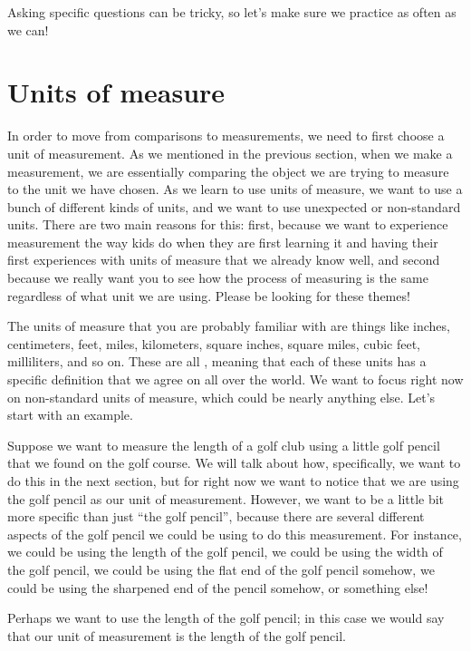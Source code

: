 \documentclass{ximera}
\begin{document}
Asking specific questions can be tricky, so let's make sure we practice as often as we can!


\section{Units of measure}

In order to move from comparisons to measurements, we need to first choose a unit of measurement. As we mentioned in the previous section, when we make a measurement, we are essentially comparing the object we are trying to measure to the unit we have chosen. As we learn to use units of measure, we want to use a bunch of different kinds of units, and we want to use unexpected or non-standard units. There are two main reasons for this: first, because we want to experience measurement the way kids do when they are first learning it and having their first experiences with units of measure that we already know well, and second because we really want you to see how the process of measuring is the same regardless of what unit we are using. Please be looking for these themes!

The units of measure that you are probably familiar with are things like inches, centimeters, feet, miles, kilometers, square inches, square miles, cubic feet, milliliters, and so on. These are all , meaning that each of these units has a specific definition that we agree on all over the world. We want to focus right now on non-standard units of measure, which could be nearly anything else. Let's start with an example.
\begin{example}
Suppose we want to measure the length of a golf club using a little golf pencil that we found on the golf course. We will talk about how, specifically, we want to do this in the next section, but for right now we want to notice that we are using the golf pencil as our unit of measurement. However, we want to be a little bit more specific than just ``the golf pencil'', because there are several different aspects of the golf pencil we could be using to do this measurement. For instance, we could be using the length of the golf pencil, we could be using the width of the golf pencil, we could be using the flat end of the golf pencil somehow, we could be using the sharpened end of the pencil somehow, or something else!

Perhaps we want to use the length of the golf pencil; in this case we would say that our unit of measurement is the length of the golf pencil.
\end{example}
\end{document}
